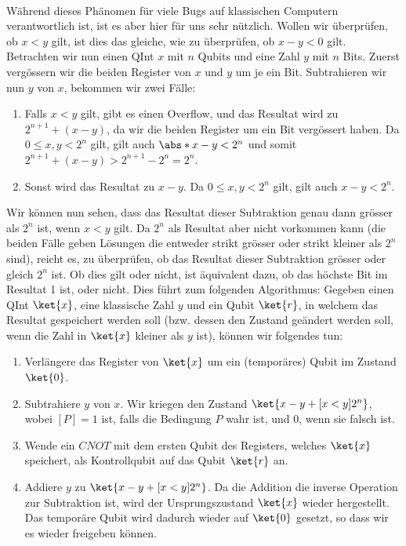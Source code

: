 \paragraph{}
Während dieses Phänomen für viele Bugs auf klassischen Computern verantwortlich ist, ist es aber hier für uns sehr nützlich. Wollen wir überprüfen, ob $x < y$ gilt, ist dies das gleiche, wie zu überprüfen, ob $x - y < 0$ gilt. Betrachten wir nun einen QInt $x$ mit $n$ Qubits und eine Zahl $y$ mit $n$ Bits. Zuerst vergössern wir die beiden Register von $x$ und $y$ um je ein Bit. Subtrahieren wir nun $y$ von $x$, bekommen wir zwei Fälle:
\begin{enumerate}
    \item Falls $x < y$ gilt, gibt es einen Overflow, und das Resultat wird zu $2^{n + 1} + (x - y)$, da wir die beiden Register um ein Bit vergössert haben. Da $0 \leq x, y < 2^n$ gilt, gilt auch $\abs*{x - y} < 2^n$ und somit $2^{n + 1} + (x - y) > 2^{n + 1} - 2^n = 2^n$.
    \item Sonst wird das Resultat zu $x - y$. Da $0 \leq x, y < 2^n$ gilt, gilt auch $x - y < 2^n$.
\end{enumerate}
Wir können nun sehen, dass das Resultat dieser Subtraktion genau dann grösser als $2^n$ ist, wenn $x < y$ gilt. Da $2^n$ als Resultat aber nicht vorkommen kann (die beiden Fälle geben Lösungen die entweder strikt grösser oder strikt kleiner als $2^n$ sind), reicht es, zu überprüfen, ob das Resultat dieser Subtraktion grösser oder gleich $2^n$ ist. Ob dies gilt oder nicht, ist äquivalent dazu, ob das höchste Bit im Resultat 1 ist, oder nicht. Dies führt zum folgenden Algorithmus:
Gegeben einen QInt $\ket{x}$, eine klassische Zahl $y$ und ein Qubit $\ket{r}$, in welchem das Resultat gespeichert werden soll (bzw. dessen den Zustand geändert werden soll, wenn die Zahl in $\ket{x}$ kleiner als $y$ ist), können wir folgendes tun:

\begin{enumerate}
    \item Verlängere das Register von $\ket{x}$ um ein (temporäres) Qubit im Zustand $\ket{0}$.
    \item Subtrahiere $y$ von $x$. Wir kriegen den Zustand $\ket{x - y + [x < y]2^n}$, wobei $[P] = 1$ ist, falls die Bedingung $P$ wahr ist, und $0$, wenn sie falsch ist.
    \item Wende ein $CNOT$ mit dem ersten Qubit des Registers, welches $\ket{x}$ speichert, als Kontrollqubit auf das Qubit $\ket{r}$ an.
    \item Addiere $y$ zu $\ket{x - y + [x < y]2^n}$. Da die Addition die inverse Operation zur Subtraktion ist, wird der Ursprungszustand $\ket{x}$ wieder hergestellt. Das temporäre Qubit wird dadurch wieder auf $\ket{0}$ gesetzt, so dass wir es wieder  freigeben können.
\end{enumerate}

